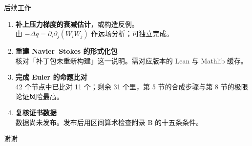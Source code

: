 \documentclass[aspectratio=169,11pt,fontset=windows]{ctexbeamer}
\begin{document}
\begin{frame}{后续工作}
  \small
  \begin{enumerate}
    \setlength{\itemsep}{4pt}
    \item \textbf{补上压力梯度的衰减估计}，或构造反例。\\[1pt]
      \footnotesize 由 $-\Delta q=\partial_i\partial_j(W_iW_j)$ 作远场分析；可独立完成。
    \item \textbf{重建 Navier--Stokes 的形式化包}\\[1pt]
      \footnotesize 核对「补丁包未重新构建」这一说明。需对应版本的 Lean 与 Mathlib 缓存。
    \item \textbf{完成 Euler 的命题比对}\\[1pt]
      \footnotesize 42 个节点中已比对 11 个；剩余 31 个里，第 5 节的合成步骤与第 8 节的极限论证风险最高。
    \item \textbf{复核证书数据}\\[1pt]
      \footnotesize 数据尚未发布。发布后用区间算术检查附录 B 的十五条条件。
  \end{enumerate}

  \vfill
  \centering
  谢谢
\end{frame}
\end{document}
